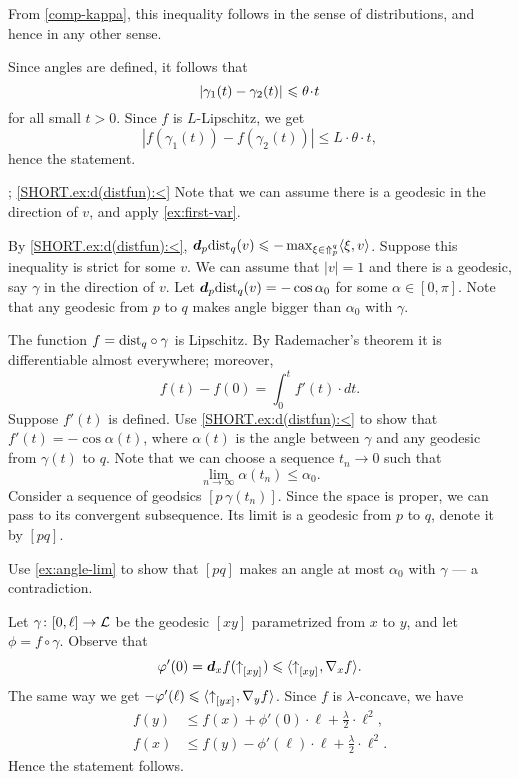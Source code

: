  From \ref{comp-kappa}, this inequality follows in the sense of distributions, and hence in any other sense.

Since angles are defined, it follows that 
\[\dist{\gamma_1(t)}{\gamma_2(t)}{}\le \theta\cdot t\]
for all small $t>0$.
Since $f$ is $L$-Lipschitz, we get 
\[|f(\gamma_1(t))-f(\gamma_2(t))|\le L\cdot \theta\cdot t,\]
hence the statement.

\parbf{\ref{ex:d(distfun)}}; \ref{SHORT.ex:d(distfun):<}
Note that we can assume there is a geodesic in the direction of $v$, and apply \ref{ex:first-var}.

By \ref{SHORT.ex:d(distfun):<}, $\bm{d}_p\mathrm{dist}_q(v)\leqslant-\max_{\xi\in\Uparrow_p^q}\langle\xi,v\rangle$.
Suppose this inequality is strict for some $v$.
We can assume that $|v|=1$ and there is a geodesic, say $\gamma$ in the direction of $v$.
Let $\bm{d}_p\mathrm{dist}_q(v)=-\cos\alpha_0$ for some $\alpha\in [0,\pi]$.
Note that any geodesic from $p$ to $q$ makes angle bigger than $\alpha_0$ with $\gamma$.


The function $f=\mathrm{dist}_q\circ\gamma$ is Lipschitz.
By Rademacher's theorem it is differentiable almost everywhere;
moreover, 
\[f(t)-f(0)=\int_0^t f'(t)\cdot dt.\]
Suppose $f'(t)$ is defined.
Use \ref{SHORT.ex:d(distfun):<} to show that 
$f'(t)=-\cos\alpha(t)$, where $\alpha(t)$ is the angle between $\gamma$ and any geodesic from $\gamma(t)$ to $q$.
Note that we can choose a sequence $t_n\to 0$ such that 
\[\lim_{n\to\infty}\alpha(t_n) \le \alpha_0.\]
Consider a sequence of geodsics $[p\,\gamma(t_n)]$.
Since the space is proper, we can pass to its convergent subsequence.
Its limit is a geodesic from $p$ to $q$, denote it by $[pq]$.

Use \ref{ex:angle-lim} to show that $[pq]$ makes an angle at most $\alpha_0$ with $\gamma$ --- a contradiction.
 
Let $\gamma\colon[0,\ell]\to \mathcal{L}$ be the geodesic $[xy]$ parametrized from $x$ to $y$,
and let $\phi=f\circ\gamma$.
Observe that 
\[\varphi'(0)=\bm{d}_xf({\uparrow}_{[{x}{y}]_{{}}})\leqslant \langle{\uparrow}_{[{x}{y}]_{{}}},\nabla_{x}f\rangle.\]
The same way we get $-\varphi'(\ell)\leqslant \langle{\uparrow}_{[{y}{x}]_{{}}},\nabla_{y}f\rangle$.
Since $f$ is $\lambda$-concave, we have
\begin{align*}
f(y)&\le f(x)+\phi'(0)\cdot \ell+\tfrac\lambda2\cdot\ell^2,
\\
f(x)&\le f(y)-\phi'(\ell)\cdot \ell+\tfrac\lambda2\cdot\ell^2.
\end{align*}
Hence the statement follows.

